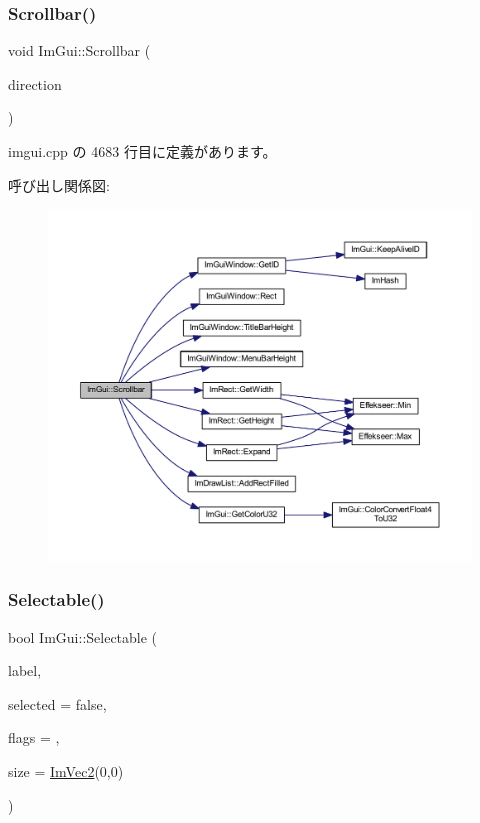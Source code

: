 \subsubsection{\texorpdfstring{Scrollbar()}{Scrollbar()}}
{\footnotesize\ttfamily void Im\+Gui\+::\+Scrollbar (\begin{DoxyParamCaption}\item[{\mbox{\hyperlink{imgui__internal_8h_a86d7bb2ee8297d38b131d8ea7e6430c6}{Im\+Gui\+Layout\+Type}}}]{direction }\end{DoxyParamCaption})}



 imgui.\+cpp の 4683 行目に定義があります。

呼び出し関係図\+:\nopagebreak
\begin{figure}[H]
\begin{center}
\leavevmode
\includegraphics[width=350pt]{namespace_im_gui_abf1d7a83c5f0a555bbe7f831b0319c8a_cgraph}
\end{center}
\end{figure}
\mbox{\label{namespace_im_gui_af98575238bda183a523df19fb447af60}} 
\subsubsection{\texorpdfstring{Selectable()}{Selectable()}\hspace{0.1cm}{\footnotesize\ttfamily [1/2]}}
{\footnotesize\ttfamily bool Im\+Gui\+::\+Selectable (\begin{DoxyParamCaption}\item[{const char $\ast$}]{label,  }\item[{bool}]{selected = {\ttfamily false},  }\item[{\mbox{\hyperlink{imgui_8h_aab0fe56421d75949dedfbfbbaa674b6b}{Im\+Gui\+Selectable\+Flags}}}]{flags = {},  }\item[{const \mbox{\hyperlink{struct_im_vec2}{Im\+Vec2}} \&}]{size = {\ttfamily \mbox{\hyperlink{struct_im_vec2}{Im\+Vec2}}(0,0)} }\end{DoxyParamCaption})}



